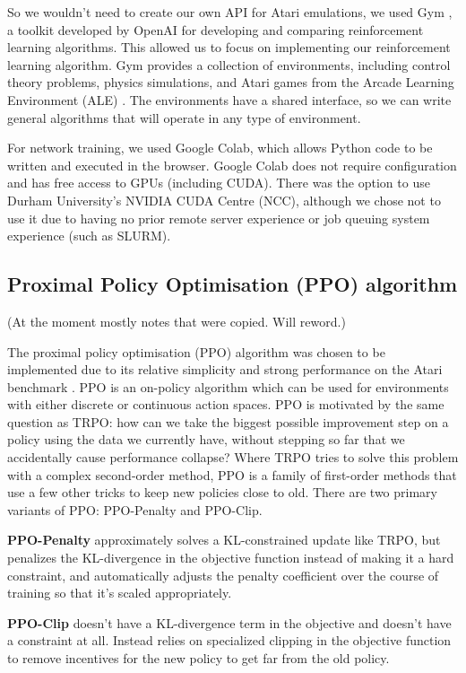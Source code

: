 \documentclass[12pt,a4paper]{article}
\begin{document}
So we wouldn't need to create our own API for Atari emulations, we used Gym \cite{1606.01540}, a toolkit developed by OpenAI for developing and comparing reinforcement learning algorithms. This allowed us to focus on implementing our reinforcement learning algorithm. Gym provides a collection of environments, including control theory problems, physics simulations, and Atari games from the Arcade Learning Environment (ALE) \cite{bellemare13arcade}. The environments have a shared interface, so we can write general algorithms that will operate in any type of environment.

For network training, we used Google Colab, which allows Python code to be written and executed in the browser. Google Colab does not require configuration and has free access to GPUs (including CUDA). There was the option to use Durham University's NVIDIA CUDA Centre (NCC), although we chose not to use it due to having no prior remote server experience or job queuing system experience (such as SLURM).

\subsection{Proximal Policy Optimisation (PPO) algorithm}
(At the moment mostly notes that were copied. Will reword.)

The proximal policy optimisation (PPO) algorithm was chosen to be implemented due to its relative simplicity and strong performance on the Atari benchmark \cite{DBLP:journals/corr/SchulmanWDRK17}. PPO is an on-policy algorithm which can be used for environments with either discrete or continuous action spaces. PPO is motivated by the same question as TRPO: how can we take the biggest possible improvement step on a policy using the data we currently have, without stepping so far that we accidentally cause performance collapse? Where TRPO tries to solve this problem with a complex second-order method, PPO is a family of first-order methods that use a few other tricks to keep new policies close to old. There are two primary variants of PPO: PPO-Penalty and PPO-Clip.

\textbf{PPO-Penalty} approximately solves a KL-constrained update like TRPO, but penalizes the KL-divergence in the objective function instead of making it a hard constraint, and automatically adjusts the penalty coefficient over the course of training so that it’s scaled appropriately.

\textbf{PPO-Clip} doesn’t have a KL-divergence term in the objective and doesn’t have a constraint at all. Instead relies on specialized clipping in the objective function to remove incentives for the new policy to get far from the old policy.
\end{document}
